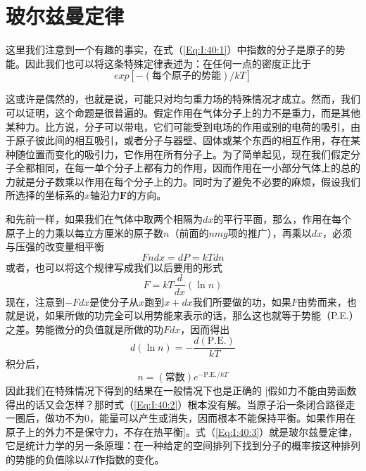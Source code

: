 \section{玻尔兹曼定律}

这里我们注意到一个有趣的事实，在式（\ref{Eq:I:40:1}）中指数的分子是原子的势能。因此我们也可以将这条特殊定律表述为：在任何一点的密度正比于
\begin{equation*}
    exp[-(\text{每个原子的势能})/kT]
\end{equation*}

这或许是偶然的，也就是说，可能只对均匀重力场的特殊情况才成立。然而，我们可以证明，这个命题是很普遍的。假定作用在气体分子上的力不是重力，而是其他某种力。比方说，分子可以带电，它们可能受到电场的作用或别的电荷的吸引，由于原子彼此间的相互吸引，或者分子与器壁、固体或某个东西的相互作用，存在某种随位置而变化的吸引力，它作用在所有分子上。为了简单起见，现在我们假定分子全都相同，在每一单个分子上都有力的作用，因而作用在一小部分气体上的总的力就是分子数乘以作用在每个分子上的力。同时为了避免不必要的麻烦，假设我们所选择的坐标系的$x$轴沿力$\boldsymbol{F}$的方向。

和先前一样，如果我们在气体中取两个相隔为$dx$的平行平面，那么，作用在每个原子上的力乘以每立方厘米的原子数$n$（前面的$nmg$项的推广），再乘以$dx$，必须与压强的改变量相平衡
\begin{equation*}
    Fndx = dP = kTdn
\end{equation*}
或者，也可以将这个规律写成我们以后要用的形式
\begin{equation}
    \label{Eq:I:40:2}
    F = kT\frac{d}{dx}(\ln n)
\end{equation}
现在，注意到$-Fdx$是使分子从$x$跑到$x+dx$我们所要做的功，如果$F$由势而来，也就是说，如果所做的功完全可以用势能来表示的话，那么这也就等于势能（P.E.）之差。势能微分的负值就是所做的功$Fdx$，因而得出
\begin{equation*}
    d(\ln n) = -\frac{d(\text{P.E.})}{kT}
\end{equation*}
积分后，
\begin{equation}
    \label{Eq:I:40:3}
    n = (\text{常数})e^{-\text{P.E.}/kT}
\end{equation}
因此我们在特殊情况下得到的结果在一般情况下也是正确的 [假如力不能由势函数得出的话又会怎样？那时式（\ref{Eq:I:40:2}）根本没有解。当原子沿一条闭合路径走一圈后，做功不为$0$，能量可以产生或消失，因而根本不能保持平衡。如果作用在原子上的外力不是保守力，不存在热平衡]。式（\ref{Eq:I:40:3}）就是玻尔兹曼定律，它是统计力学的另一条原理：在一种给定的空间排列下找到分子的概率按这种排列的势能的负值除以$kT$作指数的变化。

